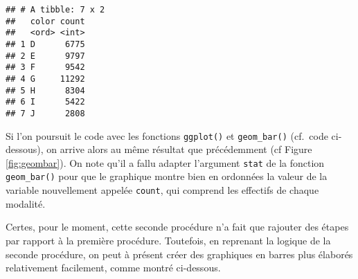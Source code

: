 \documentclass[
  french,
]{book}
\newenvironment{Shaded}{\begin{snugshade}}{\end{snugshade}}
\newcommand{\DataTypeTok}[1]{\textcolor[rgb]{0.13,0.29,0.53}{#1}}
\newcommand{\KeywordTok}[1]{\textcolor[rgb]{0.13,0.29,0.53}{\textbf{#1}}}
\newcommand{\NormalTok}[1]{#1}
\newcommand{\OperatorTok}[1]{\textcolor[rgb]{0.81,0.36,0.00}{\textbf{#1}}}
\newcommand{\StringTok}[1]{\textcolor[rgb]{0.31,0.60,0.02}{#1}}
\begin{document}
\begin{Shaded}
\end{Shaded}

\begin{verbatim}
## # A tibble: 7 x 2
##   color count
##   <ord> <int>
## 1 D      6775
## 2 E      9797
## 3 F      9542
## 4 G     11292
## 5 H      8304
## 6 I      5422
## 7 J      2808
\end{verbatim}

Si l'on poursuit le code avec les fonctions \texttt{ggplot()} et \texttt{geom\_bar()} (cf.~code ci-dessous), on arrive alors au même résultat que précédemment (cf Figure \ref{fig:geombar}). On note qu'il a fallu adapter l'argument \texttt{stat} de la fonction \texttt{geom\_bar()} pour que le graphique montre bien en ordonnées la valeur de la variable nouvellement appelée \texttt{count}, qui comprend les effectifs de chaque modalité.

\begin{Shaded}
\end{Shaded}

Certes, pour le moment, cette seconde procédure n'a fait que rajouter des étapes par rapport à la première procédure. Toutefois, en reprenant la logique de la seconde procédure, on peut à présent créer des graphiques en barres plus élaborés relativement facilement, comme montré ci-dessous.
\end{document}
